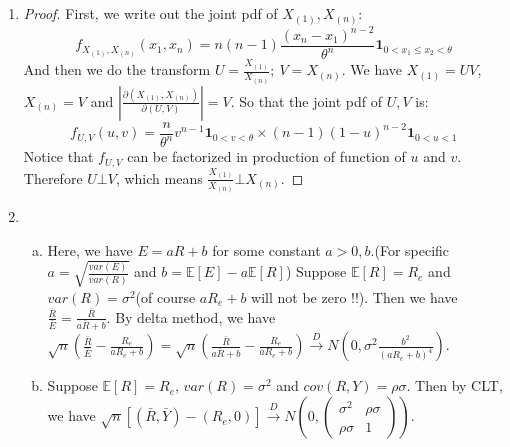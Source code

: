 \documentclass[12pt]{article}
\newcommand{\ep}[1]{\mathbb{E}\left[ #1 \right]}
\newcommand{\var}[1]{var \left( #1 \right)}
\newcommand{\cd}{\overset{D}{\to}}
\begin{document}
\begin{enumerate}
    \item
    \begin{proof}
        First, we write out the joint pdf of $X_{(1)}, X_{(n)}$: 
        $$f_{X_{(1)}, X_{(n)}}(x_1, x_n) = n(n-1)\frac{(x_n-x_1)^{n-2}}{\theta^n} \bm{1}_{0<x_1\le x_2<\theta}$$
        And then we do the transform $U = \frac{X_{(1)}}{X_{(n)}}; \  V = X_{(n)}$. We have $X_{(1)} = U V$, $X_{(n)} = V$ and $|\frac{\partial (X_{(1)},X_{(n)})}{\partial (U, V)}| = V$.
        So that the joint pdf of $U, V$ is:
        $$f_{U,V}(u,v) = \frac{n}{\theta^n} v^{n-1}\bm{1}_{0<v<\theta} \times (n-1)(1-u)^{n-2} \bm{1}_{0<u<1} $$
        Notice that $f_{U,V}$ can be factorized in production of function of $u$ and $v$. Therefore $U \bot V$, which means $\frac{X_{(1)}}{X_{(n)}} \bot X_{(n)}$. 
    \end{proof}
    
    \item
    \begin{enumerate}[(a)]
        \item
        Here, we have $E = a R + b$ for some constant $a>0,b$.(For specific $a = \sqrt{\frac{\var{E}}{\var{R}}}$ and $b = \ep{E} - a\ep{R}$) Suppose $\ep{R} = R_e$ and $\var{R} = \sigma^2$(of course $aR_e + b$ will not be zero !!).
        Then we have $\frac{\bar{R}}{\bar{E}} = \frac{\bar{R}}{a\bar{R} + b}$. By delta method, we have $\sqrt{n}(\frac{\bar{R}}{\bar{E}} - \frac{R_e}{aR_e + b}) = \sqrt{n}(\frac{\bar{R}}{a\bar{R} + b} - \frac{R_e}{aR_e + b}) \cd N(0, \sigma^2 \frac{b^2}{(aR_e+b)^4})$.
        \item
        Suppose $\ep{R} = R_e$, $var(R) = \sigma^2$ and $cov(R, Y) = \rho \sigma$. Then by CLT, we have $\sqrt{n}[(\bar{R},\bar{Y}) - (R_e,0)] \cd N(0, \begin{pmatrix}
                                                                                                                                                            \sigma^2 & \rho \sigma \\
                                                                                                                                                            \rho \sigma & 1                
                                                                                                                                                            \end{pmatrix})$.


\end{enumerate}
\end{enumerate}
\end{document}
